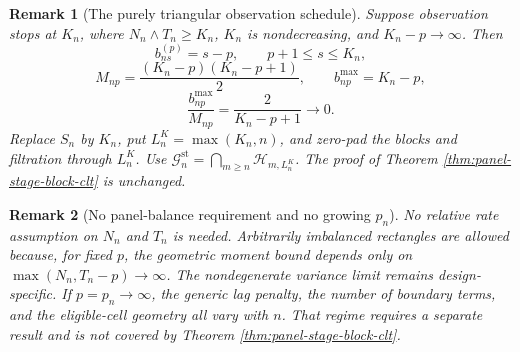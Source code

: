 \documentclass[11pt]{article}
\newcommand{\G}{\mathcal{G}}
\newcommand{\Hcal}{\mathcal{H}}
\newtheorem{remark}{Remark}
\theoremstyle{definition}
\begin{document}
\begin{remark}[The purely triangular observation schedule]
\label{rem:panel-triangular-schedule}
Suppose observation stops at \(K_n\), where \(N_n\wedge T_n\geq K_n\), \(K_n\) is nondecreasing, and \(K_n-p\to\infty\).
Then
\[
b^{(p)}_{ns}=s-p,\qquad p+1\leq s\leq K_n,
\]
\[
M_{np}=\frac{(K_n-p)(K_n-p+1)}2,
\qquad b_{np}^{\max}=K_n-p,
\]
\[
\frac{b_{np}^{\max}}{M_{np}}
=\frac2{K_n-p+1}\longrightarrow0.
\]
Replace \(S_n\) by \(K_n\), put \(L_n^{K}=\max(K_n,n)\), and zero-pad the blocks and filtration through \(L_n^{K}\).
Use \(\G_n^{\mathrm{st}}=\bigcap_{m\geq n}\Hcal_{m,L_n^{K}}\).
The proof of Theorem \ref{thm:panel-stage-block-clt} is unchanged.
\end{remark}

\begin{remark}[No panel-balance requirement and no growing \(p_n\)]
\label{rem:panel-no-balance}
No relative rate assumption on \(N_n\) and \(T_n\) is needed.
Arbitrarily imbalanced rectangles are allowed because, for fixed \(p\), the geometric moment bound depends only on \(\max(N_n,T_n-p)\to\infty\).
The nondegenerate variance limit remains design-specific.
If \(p=p_n\to\infty\), the generic lag penalty, the number of boundary terms, and the eligible-cell geometry all vary with \(n\).
That regime requires a separate result and is not covered by Theorem \ref{thm:panel-stage-block-clt}.
\end{remark}
\end{document}
